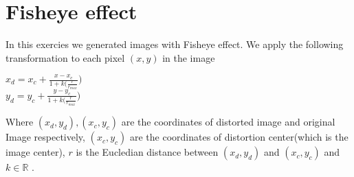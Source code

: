 \documentclass[paper=a4, fontsize=11pt]{scrartcl} %
\numberwithin{equation}{section} %
\numberwithin{figure}{section} %
\numberwithin{table}{section} %
\begin{document}

\section{Fisheye effect}

In this exercies we generated images with Fisheye effect. We apply the following transformation to each pixel \((x,y)\) in the image

\(x_d = x_c + \frac{x - x_c}{1 + k(\frac{r}{r_{max}}}) \)\\
\(y_d = y_c + \frac{y - y_c}{1 + k(\frac{r}{r_{max}}}) \)

Where \((x_d, y_d), (x_c, y_c)\) are the coordinates of distorted image and original Image respectively, \((x_c,y_c)\) are the coordinates of distortion center(which is the image center), \(r\) is the Eucledian distance between \((x_d, y_d)\) and \((x_c, y_c)\) and \(k \in \mathbb{R}\) .

\end{document}
